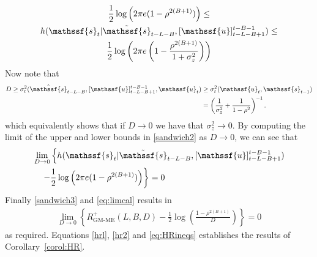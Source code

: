 \documentclass[journal, twocolumn, 10pt]{IEEEtran}
\newcommand{\rvs}{{\mathssf{s}}}    %
\newcommand{\rvu}{{\mathssf{u}}}    %
\begin{document}
{\begin{multline}
\frac{1}{2}\log\left(2 \pi e (1-\rho^{2(B+1)})\right) \le \\ h(\rvs_t | \tilde{\rvs}_{t-L-B}, [\rvu]_{t-L-B+1}^{t-B-1})  \le \\ \frac{1}{2}\log\left(2 \pi e \left(1-\frac{\rho^{2(B+1)}}{1+\sigma^2_{z}}\right)\right) \label{sandwich2}
\end{multline}
Now note that 
\begin{align}
D\ge \sigma^2_{t}(\hat{\rvs}_{t-L-B}, [\rvu]_{t-L-B+1}^{t-B-1}, \rvu_{t}) &\ge \sigma^{2}_{t}(\rvu_{t}, \rvs_{t-1})\label{hr1g}\\
&=\left(\frac{1}{\sigma^{2}_{z}} + \frac{1}{1-\rho^2}\right)^{-1}.
\end{align} which equivalently shows that if $D\rightarrow 0$ we have that $\sigma_z^2 \rightarrow 0$. By computing the limit of the upper and lower bounds in  \eqref{sandwich2} as $D\to 0$, we can see that 
\begin{align}
&\lim _{D\to 0}  \left\{h(\rvs_t | \tilde{\rvs}_{t-L-B}, [\rvu]_{t-L-B+1}^{t-B-1}) \right.\notag\\
&\left.\quad- \frac{1}{2}\log \left(2 \pi e (1-\rho^{2(B+1)})\right)\right\} =0 \label{sandwich3}
\end{align} Finally \eqref{sandwich3} and   \eqref{eq:limcal} results in 
\begin{align}
\lim_{D\to 0} \left\{R^{+}_{\textrm{GM-ME}}(L,B,D) - \frac{1}{2}\log\left(\frac{1-\rho^{2(B+1)}}{D}\right)\right\} =0 \label{hr2}
\end{align} as required. Equations \eqref{hrl}, \eqref{hr2} and \eqref{eq:HRineqs} establishes the results of Corollary~\ref{corol:HR}.


%
%
%
%
%
%
%
%

}
\end{document}
